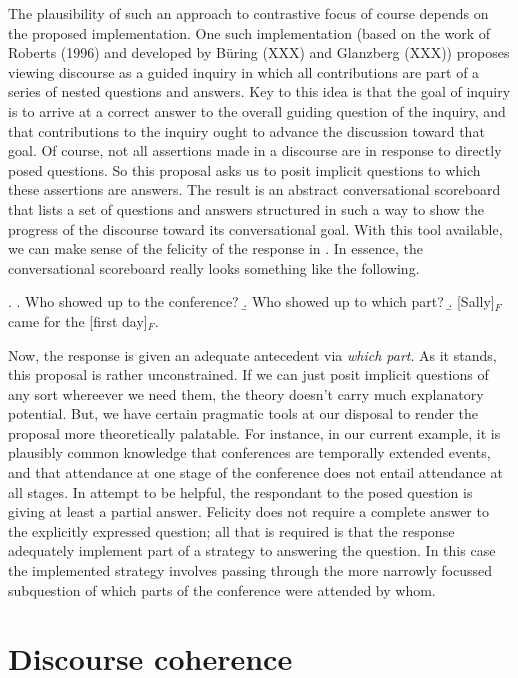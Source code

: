 \documentclass[10pt]{article}
\begin{document}
The plausibility of such an approach to contrastive focus of course depends on the proposed implementation.  One such implementation (based on the work of Roberts (1996) and developed by B\"{u}ring (XXX) and Glanzberg (XXX)) proposes viewing discourse as a guided inquiry in which all contributions are part of a series of nested questions and answers.  Key to this idea is that the goal of inquiry is to arrive at a correct answer to the overall guiding question of the inquiry, and that contributions to the inquiry ought to advance the discussion toward that goal.  Of course, not all assertions made in a discourse are in response to directly posed questions.  So this proposal asks us to posit implicit questions to which these assertions are answers.  The result is an abstract conversational scoreboard that lists a set of questions and answers structured in such a way to show the progress of the discourse toward its conversational goal.  With this tool available, we can make sense of the felicity of the response in \Last[b].  In essence, the conversational scoreboard really looks something like the following.

\ex. \a. Who showed up to the conference?
\b. Who showed up to which part?
\b. [Sally]$_F$ came for the [first day]$_F$.

Now, the response is given an adequate antecedent via \textit{which part}.  As it stands, this proposal is rather unconstrained.  If we can just posit implicit questions of any sort whereever we need them, the theory doesn't carry much explanatory potential.  But, we have certain pragmatic tools at our disposal to render the proposal more theoretically palatable.  For instance, in our current example, it is plausibly common knowledge that conferences are temporally extended events, and that attendance at one stage of the conference does not entail attendance at all stages.  In attempt to be helpful, the respondant to the posed question is giving at least a partial answer.  Felicity does not require a complete answer to the explicitly expressed question; all that is required is that the response adequately implement part of a strategy to answering the question.  In this case the implemented strategy involves passing through the more narrowly focussed subquestion of which parts of the conference were attended by whom.

\section{Discourse coherence}
\end{document}

